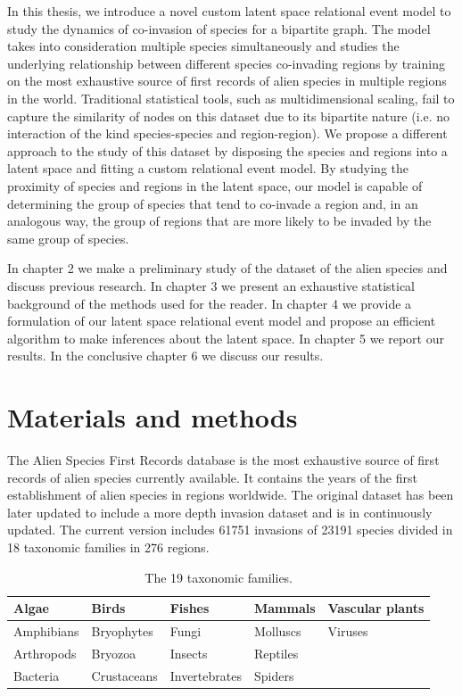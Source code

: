 \documentclass[mscthesis]{usiinfthesis}
\begin{document}
In this thesis, we introduce a novel custom latent space relational event model to study the dynamics of co-invasion of species for a bipartite graph. The model takes into consideration multiple species simultaneously and studies the underlying relationship between different species co-invading regions by training on the most exhaustive source of first records of alien species in multiple regions in the world. Traditional statistical tools, such as multidimensional scaling, fail to capture the similarity of nodes on this dataset due to its bipartite nature (i.e. no interaction of the kind species-species and region-region). We propose a different approach to the study of this dataset by disposing the species and regions into a latent space and fitting a custom relational event model. By studying the proximity of species and regions in the latent space, our model is capable of determining the group of species that tend to co-invade a region and, in an analogous way, the group of regions that are more likely to be invaded by the same group of species.


In chapter 2 we make a preliminary study of the dataset of the alien species and discuss previous research. In chapter 3 we present an exhaustive statistical background of the methods used for the reader. In chapter 4 we provide a formulation of our latent space relational event model and propose an efficient algorithm to make inferences about the latent space. In chapter 5 we report our results. In the conclusive chapter 6 we discuss our results.



\chapter{Materials and methods}

The Alien Species First Records database \cite{intro:dataset} is the most exhaustive source of first records of alien species currently available. It contains the years of the first establishment of alien species in regions worldwide. 
The original dataset has been later updated to include a more depth invasion dataset \cite{intro:datasetv2} and is in continuously updated. The current version includes 61751 invasions of 23191 species divided in 18 taxonomic families in 276 regions.


\begin{table}[H]
\centering
\begin{tabular}{|l|l|l|l|l|}
\hline
Algae      & Birds       & Fishes        & Mammals  & Vascular plants \\ \hline
Amphibians & Bryophytes  & Fungi         & Molluscs & Viruses         \\ \hline
Arthropods & Bryozoa     & Insects       & Reptiles &                 \\ \hline
Bacteria   & Crustaceans & Invertebrates & Spiders  &                 \\ \hline             
\end{tabular}
\caption{The 19 taxonomic families.}
\label{table:families}
\end{table}
\end{document}
